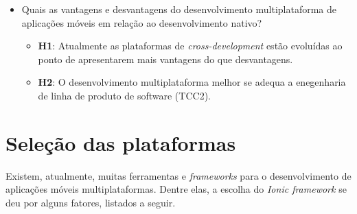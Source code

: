 \begin{itemize}
    \item Quais as vantagens e desvantagens do desenvolvimento multiplataforma de aplicações móveis em relação ao desenvolvimento nativo?
    \begin{itemize}
        \item \textbf{H1}: Atualmente as plataformas de \textit{cross-development} estão evoluídas ao ponto de apresentarem mais vantagens do que desvantagens.
        \item \textbf{H2}: O desenvolvimento multiplataforma melhor se adequa a enegenharia de linha de produto de software (TCC2).
    \end{itemize}

     
\end{itemize}

\section{Seleção das plataformas} \label{sec:selecaodasplataformas}

Existem, atualmente, muitas ferramentas e \textit{frameworks} para o desenvolvimento de aplicações móveis multiplataformas. Dentre elas, a escolha do \textit{Ionic framework} se deu por alguns fatores, listados a seguir. 

